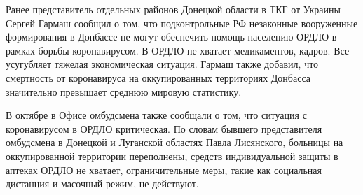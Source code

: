 Ранее представитель отдельных районов Донецкой области в ТКГ от Украины Сергей
Гармаш сообщил о том, что подконтрольные РФ незаконные вооруженные формирования
в Донбассе не могут обеспечить помощь населению ОРДЛО в рамках борьбы
коронавирусом. В ОРДЛО не хватает медикаментов, кадров. Все усугубляет тяжелая
экономическая ситуация. Гармаш также добавил, что смертность от коронавируса на
оккупированных территориях Донбасса значительно превышает среднюю мировую
статистику.

В октябре в Офисе омбудсмена также сообщали о том, что ситуация с коронавирусом
в ОРДЛО критическая. По словам бывшего представителя омбудсмена в Донецкой и
Луганской областях Павла Лисянского, больницы на оккупированной территории
переполнены, средств индивидуальной защиты в аптеках ОРДЛО не хватает,
ограничительные меры, такие как социальная дистанция и масочный режим, не
действуют.
